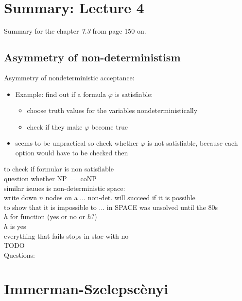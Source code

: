 \documentclass[a4]{scrartcl}
\begin{document}
\section*{Summary: Lecture 4}

Summary for the chapter \textit{7.3} from page 150 on. \cite{book}

\subsection*{Asymmetry of non-deterministism}

Asymmetry of nondeterministic acceptance:
\begin{itemize}
\item Example: find out if a formula $\varphi$ is satisfiable:
\begin{itemize}
\item choose truth values for the variables nondeterministically
\item check if they make $\varphi$ become true
\end{itemize}
\item seems to be unpractical so check whether $\varphi$ is not satisfiable, because each option would have to be checked then
\end{itemize}

to check if formular is non satisfiable \\
question whether NP $=$ coNP \\

similar isuues is non-deterministic space: \\
write down $n$ nodes on a ... non-det. will succeed if it is possible \\
to show that it is impossible to ... in SPACE was unsolved until the 80s \\
$h$ for function (yes or no or $h$?) \\
$h$ is yes \\
everything that fails stops in stae with no \\


\color{red} TODO \\
\color{black}
\color{violet} Questions:
\color{black}


\section*{Immerman-Szelepscènyi}
\end{document}
